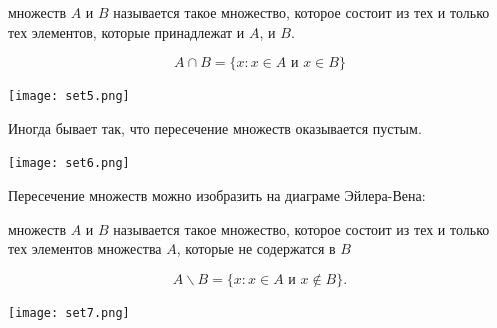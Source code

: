 \documentclass[12pt, a4paper]{article}
\begin{document}
\begin{mydef} 
 множеств $A$ и $B$ называется такое множество, которое состоит из тех и только тех  элементов, которые принадлежат и $A$, и $B$.
  
  \[A \cap B = \{x: x \in A \text{ и } x \in B \} \]
\end{mydef} 

\begin{center}
    \texttt{[image: set5.png]}
\end{center}

Иногда бывает так, что пересечение множеств оказывается пустым.

\begin{center}
    \texttt{[image: set6.png]}
\end{center}

Пересечение множеств можно изобразить на диаграме Эйлера-Вена:

\begin{center}
\end{center}

\begin{mydef} 
     множеств $A$ и $B$ называется такое множество, которое состоит из тех и только тех элементов множества $A$, которые не содержатся в $B$
  
  \[A \backslash B = \{x: x \in A \text{ и }  x \notin B\}.\]
\end{mydef} 

\begin{center}
    \texttt{[image: set7.png]}
\end{center}
\end{document}
